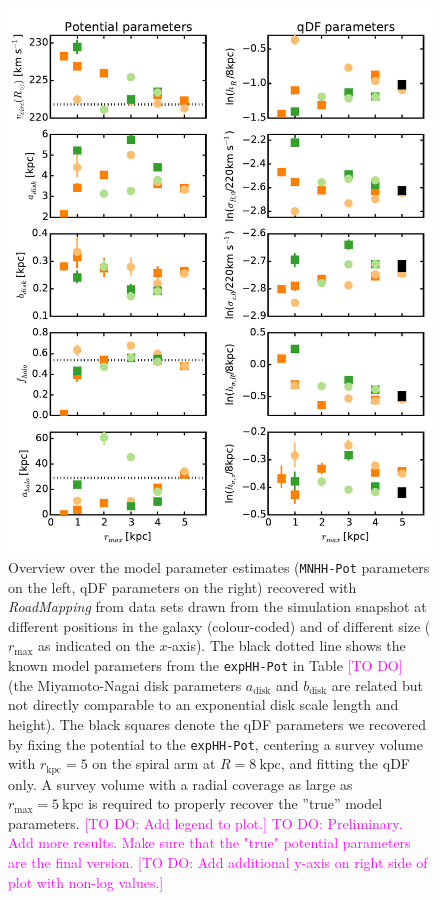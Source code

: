 \documentclass[iop,revtex4,numberedappendix,appendixfloats]{emulateapj}
\newcommand{\RM}{{\sl RoadMapping}}
\newcommand{\Wilma}[1]{\textcolor{Magenta}{#1}}
\begin{document}
\begin{figure}[!htbp]
\centering
\includegraphics[width=\columnwidth]{fig/MNdHHdiffSph2_violins.pdf}
\caption{Overview over the model parameter estimates (\texttt{MNHH-Pot} parameters on the left, qDF parameters on the right) recovered with \RM{} from data sets drawn from the simulation snapshot at different positions in the galaxy (colour-coded) and of different size ($r_\text{max}$ as indicated on the $x$-axis). The black dotted line shows the known model parameters from the \texttt{expHH-Pot} in Table \Wilma{[TO DO]} (the Miyamoto-Nagai disk parameters $a_\text{disk}$ and $b_\text{disk}$ are related but not directly comparable to an exponential disk scale length and height). The black squares denote the qDF parameters we recovered by fixing the potential to the \texttt{expHH-Pot}, centering a survey volume with $r_\text{kpc}=5$ on the spiral arm at $R=8~\text{kpc}$, and fitting the qDF only. A survey volume with a radial coverage as large as $r_\text{max}=5~\text{kpc}$ is required to properly recover the ''true'' model parameters. \Wilma{[TO DO: Add legend to plot.]} \Wilma{TO DO: Preliminary. Add more results. Make sure that the "true" potential parameters are the final version.} \Wilma{[TO DO: Add additional y-axis on right side of plot with non-log values.]}}
\label{fig:model_parameters}
\end{figure}
\end{document}
